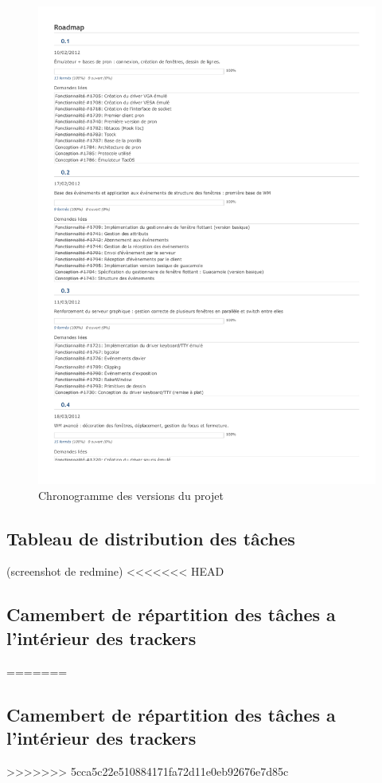 \begin{figure}[H]
  \centering
    \includegraphics{roadmap}
  \caption{Chronogramme des versions du projet}
  \label{fig:diagGant}
\end{figure}

\subsection{Tableau de distribution des tâches}
(screenshot de redmine)
<<<<<<< HEAD
\subsection{Camembert de répartition des tâches a l'intérieur des trackers}
=======
\subsection{Camembert de répartition des tâches a l'intérieur des trackers}
>>>>>>> 5cca5c22e510884171fa72d11e0eb92676e7d85c
